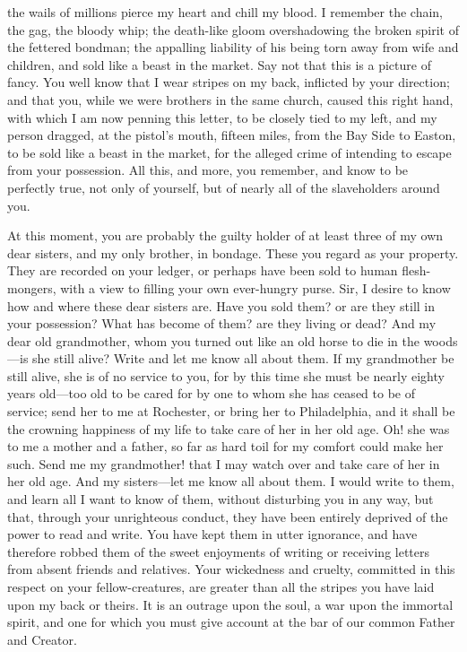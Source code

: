 the wails of millions pierce my heart and chill my blood. I remember the
chain, the gag, the bloody whip; the death-like gloom overshadowing the
broken spirit of the fettered bondman; the appalling liability of his
being torn away from wife and children, and sold like a beast in the
market. Say not that this is a picture of fancy. You well know that I
wear stripes on my back, inflicted by your direction; and that you,
while we were brothers in the same church, caused this right hand, with
which I am now penning this letter, to be closely tied to my left, and
my person dragged, at the pistol's mouth, fifteen miles, from the Bay
Side to Easton, to be sold like a beast in the market, for the alleged
crime of intending to escape from your possession. All this, and more,
you remember, and know to be perfectly true, not only of yourself, but
of nearly all of the slaveholders around you.

At this moment, you are probably the guilty holder of at least three of
my own dear sisters, and my only brother, in bondage. These you regard
as your property. They are recorded on your ledger, or perhaps have been
sold to human flesh-mongers, with a {\protect\hypertarget{427}{}{}}view
to filling your own ever-hungry purse. Sir, I desire to know how and
where these dear sisters are. Have you sold them? or are they still in
your possession? What has become of them? are they living or dead? And
my dear old grandmother, whom you turned out like an old horse to die in
the woods---is she still alive? Write and let me know all about them. If
my grandmother be still alive, she is of no service to you, for by this
time she must be nearly eighty years old---too old to be cared for by
one to whom she has ceased to be of service; send her to me at
Rochester, or bring her to Philadelphia, and it shall be the crowning
happiness of my life to take care of her in her old age. Oh! she was to
me a mother and a father, so far as hard toil for my comfort could make
her such. Send me my grandmother! that I may watch over and take care of
her in her old age. And my sisters---let me know all about them. I would
write to them, and learn all I want to know of them, without disturbing
you in any way, but that, through your unrighteous conduct, they have
been entirely deprived of the power to read and write. You have kept
them in utter ignorance, and have therefore robbed them of the sweet
enjoyments of writing or receiving letters from absent friends and
relatives. Your wickedness and cruelty, committed in this respect on
your fellow-creatures, are greater than all the stripes you have laid
upon my back or theirs. It is an outrage upon the soul, a war upon the
immortal spirit, and one for which you must give account at the bar of
our common Father and Creator.

